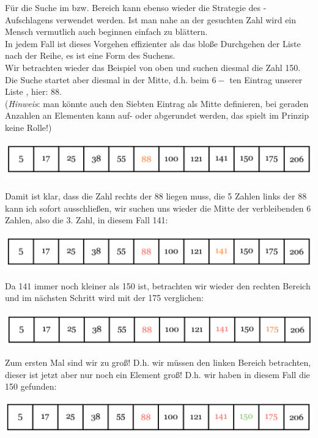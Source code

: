\documentclass{article}
\begin{document}
Für die Suche im  bzw.  Bereich kann ebenso wieder die Strategie des - Aufschlagens verwendet werden. Ist man nahe an der gesuchten Zahl wird ein Mensch vermutlich auch beginnen einfach zu blättern.\\
In jedem Fall ist dieses Vorgehen effizienter als das bloße Durchgehen der Liste nach der Reihe, es ist eine  Form des Suchens. \\
Wir betrachten wieder das Beispiel von oben und suchen diesmal die Zahl 150. Die Suche startet aber diesmal in der Mitte,  d.h. beim $6-$ ten Eintrag unserer Liste , hier: 88. \\
(\textit{Hinweis}: man könnte auch den Siebten Eintrag als Mitte definieren, bei geraden Anzahlen an Elementen kann auf- oder abgerundet werden, das spielt im Prinzip keine Rolle!)
\begin{center}
    \includegraphics[scale=0.25]{../media/search3.png}
\end{center}
Damit ist klar, dass die Zahl rechts der 88 liegen muss, die 5 Zahlen links der 88 kann ich sofort ausschließen, wir suchen uns wieder die Mitte der verbleibenden 6 Zahlen, also die 3. Zahl, in diesem Fall 141:
\begin{center}
    \includegraphics[scale=0.25]{../media/search4.png}
\end{center}
Da 141 immer noch kleiner als 150 ist, betrachten wir wieder den rechten Bereich und im nächsten Schritt wird mit der 175 verglichen:
\begin{center}
    \includegraphics[scale=0.25]{../media/search5.png}
\end{center}
Zum ersten Mal sind wir zu groß! D.h. wir müssen den linken Bereich betrachten, dieser ist jetzt aber nur noch ein Element groß! D.h. wir haben in diesem Fall die 150 gefunden:
\begin{center}
    \includegraphics[scale=0.25]{../media/search6.png}
\end{center}
\end{document}
